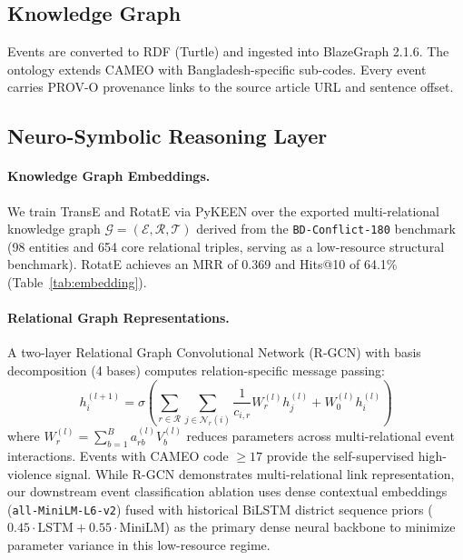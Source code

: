 \documentclass[11pt,a4paper]{article}
\begin{document}
\subsection{Knowledge Graph}
Events are converted to RDF (Turtle) and ingested into BlazeGraph 2.1.6.
The ontology extends CAMEO \citep{schrodt2012} with Bangladesh-specific
sub-codes.
Every event carries PROV-O \citep{lebo2013} provenance links to the
source article URL and sentence offset.

\subsection{Neuro-Symbolic Reasoning Layer}

\paragraph{Knowledge Graph Embeddings.}
We train TransE \citep{bordes2013} and RotatE \citep{sun2019} via PyKEEN \citep{ali2021}
over the exported multi-relational knowledge graph $\mathcal{G} = (\mathcal{E}, \mathcal{R}, \mathcal{T})$
derived from the \texttt{BD-Conflict-180} benchmark (98 entities and 654 core relational triples, serving as a low-resource structural benchmark).
RotatE achieves an MRR of 0.369 and Hits@10 of 64.1\% (Table~\ref{tab:embedding}).

\paragraph{Relational Graph Representations.}
A two-layer Relational Graph Convolutional Network (R-GCN) with basis decomposition (4 bases)
computes relation-specific message passing:
\begin{equation}
h_i^{(l+1)} = \sigma \left( \sum_{r \in \mathcal{R}} \sum_{j \in \mathcal{N}_r(i)} \frac{1}{c_{i,r}} W_r^{(l)} h_j^{(l)} + W_0^{(l)} h_i^{(l)} \right)
\end{equation}
where $W_r^{(l)} = \sum_{b=1}^B a_{rb}^{(l)} V_b^{(l)}$ reduces parameters across multi-relational event interactions.
Events with CAMEO code $\geq 17$ provide the self-supervised high-violence signal. While R-GCN demonstrates multi-relational link representation, our downstream event classification ablation uses dense contextual embeddings (\texttt{all-MiniLM-L6-v2}) fused with historical BiLSTM district sequence priors ($0.45 \cdot \text{LSTM} + 0.55 \cdot \text{MiniLM}$) as the primary dense neural backbone to minimize parameter variance in this low-resource regime.
\end{document}

